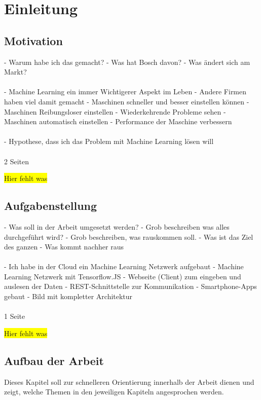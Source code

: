 \chapter{Einleitung}
\label{ch:einleitung}

\section{Motivation}
\label{sec:motivation}
- Warum habe ich das gemacht?
- Was hat Bosch davon?
- Was ändert sich am Markt?
\\ \\
- Machine Learning ein immer Wichtigerer Aspekt im Leben
- Andere Firmen haben viel damit gemacht
- Maschinen schneller und besser einstellen können
- Maschinen Reibungsloser einstellen
- Wiederkehrende Probleme sehen
- Maschinen automatisch einstellen
- Performance der Maschine verbessern
\\ \\
- Hypothese, dass ich das Problem mit Machine Learning lösen will
\\ \\
2 Seiten

\colorbox{yellow}{Hier fehlt was}

\section{Aufgabenstellung}
\label{sec:aufgabenstellung}
- Was soll in der Arbeit umgesetzt werden?
- Grob beschreiben was alles durchgeführt wird?
- Grob beschreiben, was rauskommen soll.
- Was ist das Ziel des ganzen
- Was kommt nachher raus
\\ \\
- Ich habe in der Cloud ein Machine Learning Netzwerk aufgebaut
- Machine Learning Netzwerk mit Tensorflow.JS
- Webseite (Client) zum eingeben und auslesen der Daten
- REST-Schnittstelle zur Kommunikation
- Smartphone-Apps gebaut
- Bild mit kompletter Architektur
\\ \\
1 Seite

\colorbox{yellow}{Hier fehlt was}

\newpage

\section{Aufbau der Arbeit}
\label{sec:aufbauDerArbeit}
Dieses Kapitel soll zur schnelleren Orientierung innerhalb der Arbeit dienen und zeigt, welche Themen in den jeweiligen
Kapiteln angesprochen werden.

